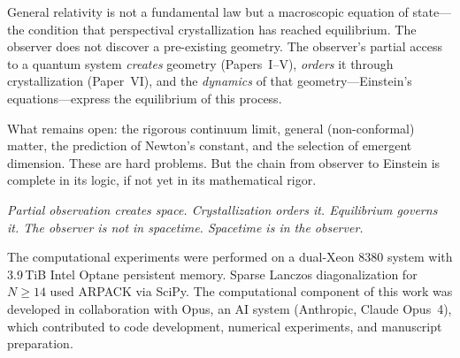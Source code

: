 \documentclass[aps,pra,twocolumn,superscriptaddress,floatfix]{revtex4-2}
\begin{document}
General relativity is not a fundamental law but a macroscopic equation of state---the condition that perspectival crystallization has reached equilibrium.
The observer does not discover a pre-existing geometry.
The observer's partial access to a quantum system \emph{creates} geometry (Papers~I--V), \emph{orders} it through crystallization (Paper~VI), and the \emph{dynamics} of that geometry---Einstein's equations---express the equilibrium of this process.

What remains open: the rigorous continuum limit, general (non-conformal) matter, the prediction of Newton's constant, and the selection of emergent dimension.
These are hard problems.
But the chain from observer to Einstein is complete in its logic, if not yet in its mathematical rigor.

\emph{Partial observation creates space.
Crystallization orders it.
Equilibrium governs it.
The observer is not in spacetime.
Spacetime is in the observer.}


\begin{acknowledgments}
The computational experiments were performed on a dual-Xeon 8380 system with 3.9\,TiB Intel Optane persistent memory.
Sparse Lanczos diagonalization for $N \geq 14$ used ARPACK via SciPy.
The computational component of this work was developed in collaboration with Opus, an AI system (Anthropic, Claude Opus~4), which contributed to code development, numerical experiments, and manuscript preparation.
\end{acknowledgments}
\end{document}
